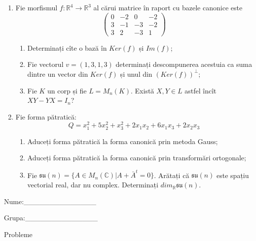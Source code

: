 \documentclass{article}
\begin{document}
\begin{enumerate}
 \item Fie morfismul $f:\mathbb{R}^4 \to \mathbb{R}^3$ al cărui matrice în raport cu bazele canonice este
$$\begin{pmatrix}
0&-2&0&-2\\
3&-1&-3&-2\\
3&2&-3&1
\end{pmatrix}$$

\begin{enumerate}
\item Determinați cîte o bază în $Ker(f)$ și $Im(f)$;
\item Fie vectorul $v=(1,3,1,3)$ determinați descompunerea acestuia ca suma dintre un vector din $Ker(f)$ și unul din $(Ker(f))^\perp$;
\item Fie $K$ un corp și fie $L=M_n(K)$. Există $X,Y \in L$ astfel încît $XY-YX=I_n$?  
\end{enumerate}
\item Fie forma pătratică:
$$Q= x_1^2+5x_2^2+x_3^2+2x_1x_2+6x_1x_3+2x_2x_3$$

\begin{enumerate}
\item Aduceți forma pătratică la forma canonică prin metoda Gauss;
\item Aduceți forma pătratică la forma canonică prin transformări ortogonale;
\item Fie $\mathfrak{su}(n)=\{ A \in M_n(\mathbb{C}) | A+\bar{A}^t=0\}$. Arătați că $\mathfrak{su}(n)$ este spațiu vectorial real, dar nu complex.
Determinați $dim_{\mathbb{R}}\mathfrak{su}(n)$.
\end{enumerate}
\end{enumerate}
\newpage
\begin{flushright}
Nume:\_\_\_\_\_\_\_\_\_\_\_\_\_\_
 
 
Grupa:\_\_\_\_\_\_\_\_\_\_\_\_\_\_
\end{flushright}
\begin{center}
\vspace{2cm}
{\Large Probleme}
\vspace{2cm}
\end{center}
\end{document}
